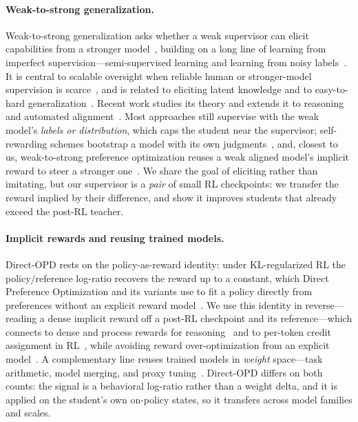 \documentclass[]{gensi}
\newcommand{\method}{Direct-OPD}
\begin{document}
\paragraph{Weak-to-strong generalization.}
Weak-to-strong generalization asks whether a weak supervisor can elicit
capabilities from a stronger model~\citep{burns2023weakstrong,superalignment},
building on a long line of learning from imperfect supervision---semi-supervised
learning and learning from noisy
labels~\citep{grandvalet2004semi,dai2015semi,laine2016temporal,athiwaratkun2018there,han2018co,berthelot2019mixmatch,li2020dividemix,chen2020big,chen2020self,chen2022debiased}.
It is central to scalable oversight when reliable human or stronger-model
supervision is scarce~\citep{christiano2018supervising,leike2018scalable,irving2018debate,bowman2022scalable,bowman2022alignment,bai2022constitutional},
and is related to eliciting latent knowledge and to easy-to-hard
generalization~\citep{christiano2022eliciting,burns2022discovering,schwarzschild2021can,schwarzschild2021datasets}.
Recent work studies its theory and extends it to reasoning and automated
alignment~\citep{survey_autoalign,bansal2025revisiting_w2s,w2s_fdivergence,guo2024improving_w2s,w2s_reasoning}.
Most approaches still supervise with the weak model's \emph{labels or
distribution}, which caps the student near the supervisor; self-rewarding schemes
bootstrap a model with its own judgments~\citep{yuan2024self}, and, closest to
us, weak-to-strong preference optimization reuses a weak aligned model's implicit
reward to steer a stronger one~\citep{wspo}. We share the goal of eliciting
rather than imitating, but our supervisor is a \emph{pair} of small RL
checkpoints: we transfer the reward implied by their difference, and show it
improves students that already exceed the post-RL teacher.

\paragraph{Implicit rewards and reusing trained models.}
\method{} rests on the policy-as-reward identity: under KL-regularized RL the
policy/reference log-ratio recovers the reward up to a constant, which Direct
Preference Optimization and its variants use to fit a policy directly from
preferences without an explicit reward
model~\citep{rafailov2023direct,azar2024ipo,ethayarajh2024kto,meng2024simpo}.
We use this identity in reverse---reading a dense implicit reward off a post-RL
checkpoint and its reference---which connects to dense and process rewards for
reasoning~\citep{lightman2023let,mathshepherd,cui2025process} and to per-token
credit assignment in RL~\citep{kazemnejad2024vineppo,creditassignsurvey}, while
avoiding reward over-optimization from an explicit
model~\citep{gao2023overopt}. A complementary line reuses trained models in
\emph{weight} space---task arithmetic, model merging, and proxy
tuning~\citep{ilharco2023task,wortsman2022soups,proxytuning}. \method{} differs
on both counts: the signal is a behavioral log-ratio rather than a weight delta,
and it is applied on the student's own on-policy states, so it transfers across
model families and scales.
\end{document}
